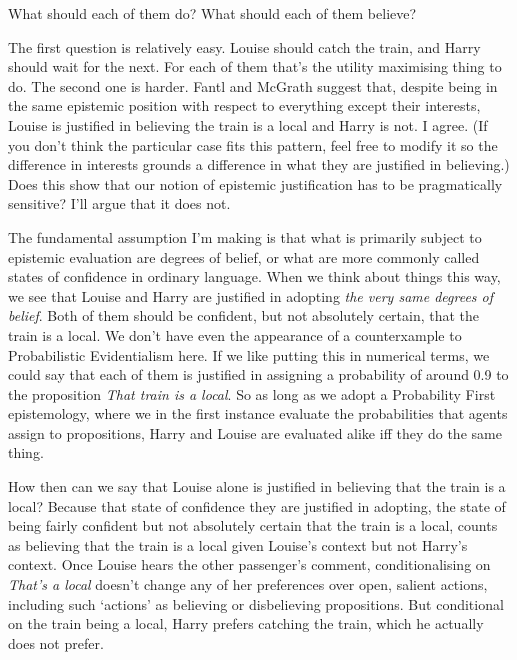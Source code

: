 \documentclass[
  11pt,
  letterpaper,
  DIV=11,
  numbers=noendperiod,
  oneside]{scrartcl}
\begin{document}
What should each of them do? What should each of them believe?

The first question is relatively easy. Louise should catch the train,
and Harry should wait for the next. For each of them that's the utility
maximising thing to do. The second one is harder. Fantl and McGrath
suggest that, despite being in the same epistemic position with respect
to everything except their interests, Louise is justified in believing
the train is a local and Harry is not. I agree. (If you don't think the
particular case fits this pattern, feel free to modify it so the
difference in interests grounds a difference in what they are justified
in believing.) Does this show that our notion of epistemic justification
has to be pragmatically sensitive? I'll argue that it does not.

The fundamental assumption I'm making is that what is primarily subject
to epistemic evaluation are degrees of belief, or what are more commonly
called states of confidence in ordinary language. When we think about
things this way, we see that Louise and Harry are justified in adopting
\emph{the very same degrees of belief}. Both of them should be
confident, but not absolutely certain, that the train is a local. We
don't have even the appearance of a counterxample to Probabilistic
Evidentialism here. If we like putting this in numerical terms, we could
say that each of them is justified in assigning a probability of around
0.9 to the proposition \emph{That train is a local}. So as long as we adopt a Probability First
epistemology, where we in the first instance evaluate the probabilities
that agents assign to propositions, Harry and Louise are evaluated alike
iff they do the same thing.

How then can we say that Louise alone is justified in believing that the
train is a local? Because that state of confidence they are justified in
adopting, the state of being fairly confident but not absolutely certain
that the train is a local, counts as believing that the train is a local
given Louise's context but not Harry's context. Once Louise hears the
other passenger's comment, conditionalising on \emph{That's a local}
doesn't change any of her preferences over open, salient actions,
including such `actions' as believing or disbelieving propositions. But
conditional on the train being a local, Harry prefers catching the
train, which he actually does not prefer.
\end{document}
